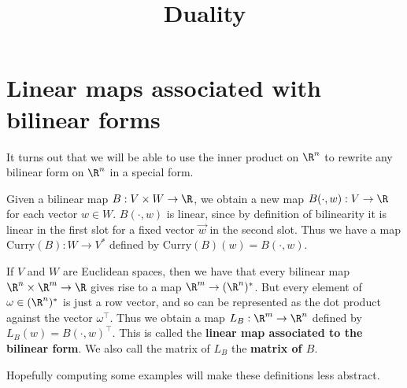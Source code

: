 \documentclass{ximera}
\title{Duality}
\begin{document}
\section{Linear maps associated with bilinear forms}
	
	It turns out that we will be able to use the inner product on $\R^n$ to rewrite any bilinear form on $\R^n$ in a special form. 
	
	Given a bilinear map $B:V \times W \to \R$, we obtain a new map $B(\cdot, w):V \to \R$ for each vector $w \in W$.   $B(\cdot, w)$ is linear, since 
	by definition of bilinearity it is linear in the first slot for a fixed vector $\vec{w}$ in the second slot.  Thus we have a map $\textrm{Curry}(B): W \to V^*$ defined by
	$\textrm{Curry}(B)(w) = B(\cdot, w)$.
	
	If $V$ and $W$ are Euclidean spaces, then we have that every bilinear map $\R^n \times \R^m \to \R$ gives rise to a map $\R^m \to (\R^n)^*$.  But every element
	of $ \omega \in (\R^n)^*$ is just a row vector, and so can be represented as the dot product against the vector  $\omega^\top$.  
	Thus we obtain a map $L_B:\R^m \to \R^n$ defined by $L_B(w) = B(\cdot,w)^\top$. 
	This is called the \textbf{linear map associated to the bilinear form}. 
	We also call the matrix of $L_B$ the \textbf{matrix of $B$}.
	
	Hopefully computing some examples will make these definitions less abstract.
	
\end{document}
